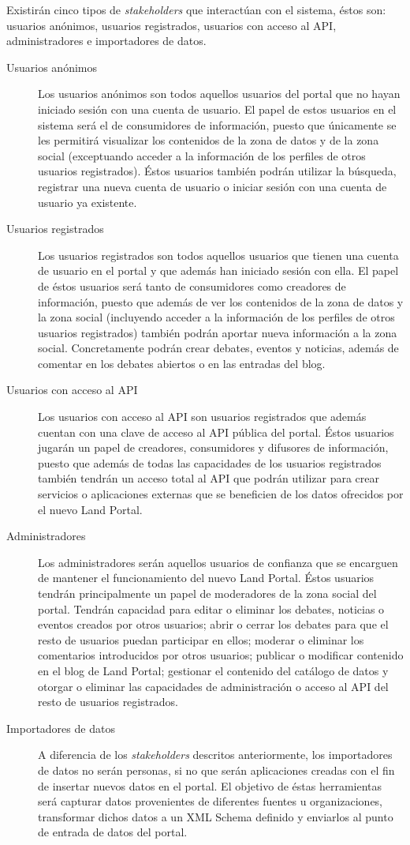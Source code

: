 Existirán cinco tipos de \textit{stakeholders} que interactúan con el sistema, éstos  son: usuarios anónimos, usuarios registrados, usuarios con acceso al API, administradores e importadores de datos.
\begin{description}
\item[Usuarios anónimos]  Los usuarios anónimos son todos aquellos usuarios del portal que no hayan iniciado sesión con una cuenta de usuario.  El papel de estos usuarios en el sistema será el de consumidores de información, puesto que únicamente se les permitirá visualizar los contenidos de la zona de datos y de la zona social (exceptuando acceder a la información de los perfiles de otros usuarios registrados).  Éstos usuarios también podrán utilizar la búsqueda, registrar una nueva cuenta de usuario o iniciar sesión con una cuenta de usuario ya existente.
\item[Usuarios registrados]  Los usuarios registrados son todos aquellos usuarios que tienen una cuenta de usuario en el portal y que además han iniciado sesión con ella.  El papel de éstos usuarios será tanto de consumidores como creadores de información, puesto que además de ver los contenidos de la zona de datos y la zona social (incluyendo acceder a la información de los perfiles de otros usuarios registrados) también podrán aportar nueva información a la zona social.  Concretamente podrán crear debates, eventos y noticias, además de comentar en los debates abiertos o en las entradas del blog.
\item[Usuarios con acceso al API]  Los usuarios con acceso al API son usuarios registrados que además cuentan con una clave de acceso al API pública del portal.  Éstos usuarios jugarán un papel de creadores, consumidores y difusores de información, puesto que además de todas las capacidades de los usuarios registrados también tendrán un acceso total al API que podrán utilizar para crear servicios o aplicaciones externas que se beneficien de los datos ofrecidos por el nuevo Land Portal.
\item[Administradores]  Los administradores serán aquellos usuarios de confianza que se encarguen de mantener el funcionamiento del nuevo Land Portal.  Éstos usuarios tendrán principalmente un papel de moderadores de la zona social del portal.  Tendrán capacidad para editar o eliminar los debates, noticias o eventos creados por otros usuarios; abrir o cerrar los debates para que el resto de usuarios puedan participar en ellos; moderar o eliminar los comentarios introducidos por otros usuarios; publicar o modificar contenido en el blog de Land Portal; gestionar el contenido del catálogo de datos y otorgar o eliminar las capacidades de administración o acceso al API del resto de usuarios registrados.
\item[Importadores de datos]  A diferencia de los \textit{stakeholders} descritos anteriormente, los importadores de datos no serán personas, si no que serán aplicaciones creadas con el fin de insertar nuevos datos en el portal.  El objetivo de éstas herramientas será capturar datos provenientes de diferentes fuentes u organizaciones, transformar dichos datos a un XML Schema definido y enviarlos al punto de entrada de datos del portal.
\end{description}



